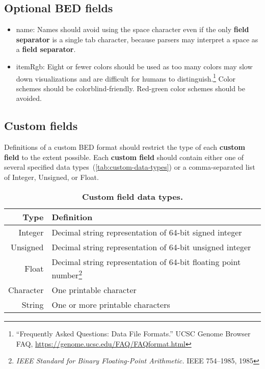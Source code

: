 \documentclass[11pt]{article}
\begin{document}
\subsection{Optional \acs{BED} fields}\label{sec:optional}
\begin{itemize}
\item \textsf{name}: Names should avoid using the space character even if the only \textbf{field separator} is a single tab character, because parsers may interpret a space as a \textbf{field separator}.

\item \textsf{itemRgb}: Eight or fewer colors should be used as too many colors may slow down visualizations and are difficult for humans to distinguish.\footnote{``Frequently
    Asked Questions: Data File Formats.'' \ac{UCSC} Genome Browser FAQ,
    \url{https://genome.ucsc.edu/FAQ/FAQformat.html}}
  Color schemes should be colorblind-friendly.
  Red-green color schemes should be avoided.

\end{itemize}

\subsection{Custom fields}

Definitions of a custom \ac{BED} format should restrict the type of each \textbf{custom field} to the extent possible.
Each \textbf{custom field} should contain either one of several specified data types~(\autoref{tab:custom-data-types}) or a comma-separated list of Integer, Unsigned, or Float.

\begin{savenotes}
  \begin{table}
    \begin{tabularx}{\textwidth}{r L}
      \toprule
      Type & Definition \\
      \midrule
      Integer & Decimal string representation of 64-bit signed integer \\
      Unsigned & Decimal string representation of 64-bit unsigned integer \\
      Float & Decimal string representation of 64-bit floating point number\footnote{\emph{IEEE Standard for Binary Floating-Point Arithmetic.}
              IEEE 754--1985, 1985} \\
      Character & One printable character \\
      String & One or more printable characters \\
      \bottomrule
    \end{tabularx}
    \caption{\textbf{Custom field data types.}}\label{tab:custom-data-types}
  \end{table}
\end{savenotes}
\end{document}
